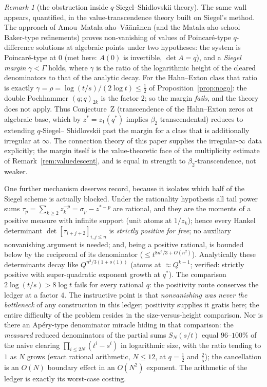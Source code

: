\documentclass[11pt]{article}
\theoremstyle{plain}
\theoremstyle{definition}
\theoremstyle{remark}
\newtheorem{remark}[theorem]{Remark}
\begin{document}
\begin{remark}[the obstruction inside $q$-Siegel--Shidlovskii theory]
\label{rem:qSS}
The same wall appears, quantified, in the value-transcendence theory built on Siegel's method. The
approach of Amou--Matala-aho--V\"a\"an\"anen \cite{AMV2007} (and the Matala-aho-school Baker-type
refinements) proves non-vanishing of values of Poincar\'e-type $q$-difference solutions at algebraic
points under two hypotheses: the system is Poincar\'e-type at $0$ (met here: $A(0)$ is invertible,
$\det A=q$), and a \emph{Siegel margin} $\gamma<\Gamma$ holds, where $\gamma$ is the ratio of the
logarithmic height of the cleared denominators to that of the analytic decay. For the Hahn--Exton
class that ratio is exactly $\gamma=\rho=\log(t/s)/(2\log t)\le\tfrac12$ of Proposition~\ref{prop:nogo}: the double Pochhammer $(q;q)_{2k}$ is the factor $2$; so the margin \emph{fails}, and the
theory does not apply. Thus Conjecture~Z (transcendence of the Hahn--Exton zeros at algebraic base,
which by $z^\ast=z_1(q^\ast)$ implies $\beta_2$ transcendental) reduces to extending $q$-Siegel--
Shidlovskii past the margin for a class that is additionally irregular at $\infty$. The connection
theory of this paper supplies the irregular-$\infty$ data explicitly; the margin itself is the
value-theoretic face of the multiplicity estimate of Remark~\ref{rem:valuedescent}, and is equal in
strength to $\beta_2$-transcendence, not weaker.

One further mechanism deserves record, because it isolates which half of the Siegel scheme is
actually blocked. Under the rationality hypothesis all tail power sums
$\tau_p=\sum_{k\ge2}z_k^{-p}=\sigma_p-z^{\ast-p}$ are rational, and they are the moments of a
positive measure with infinite support (unit atoms at $1/z_k$); hence every Hankel determinant
$\det[\tau_{i+j+2}]_{i,j\le n}$ is \emph{strictly positive for free}; no auxiliary nonvanishing
argument is needed; and, being a positive rational, is bounded below by the reciprocal of its
denominator ($\le t^{8n^3/3+O(n^2)}$). Analytically these determinants decay like
$Q^{n^3/3(1+o(1))}$ (atoms at $\approx Q^{k-1}$; verified: strictly positive with super-quadratic
exponent growth at $q^\ast$). The comparison $2\log(t/s)>8\log t$ fails for every rational $q$: the
positivity route conserves the ledger at a factor $4$. The instructive point is that
\emph{nonvanishing was never the bottleneck} of any construction in this ledger; positivity
supplies it gratis here; the entire difficulty of the problem resides in the size-versus-height
comparison. Nor is there an Ap\'ery-type denominator miracle hiding in that comparison: the
\emph{measured} reduced denominators of the partial sums $S_N(s/t)$ equal $96$--$100\%$ of the naive
clearing $\prod_{i\le2N}(t^i-s^i)$ in logarithmic size, with the ratio tending to $1$ as $N$ grows
(exact rational arithmetic, $N\le12$, at $q=\tfrac12$ and $\tfrac25$); the cancellation is an
$O(N)$ boundary effect in an $O(N^2)$ exponent. The arithmetic of the ledger is exactly its
worst-case costing.
\end{remark}
\end{document}

